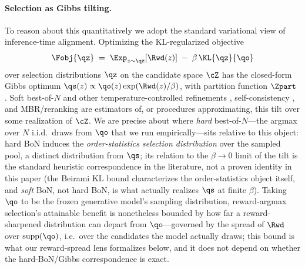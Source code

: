 \paragraph{Selection as Gibbs tilting.}
To reason about this quantitatively we adopt the standard variational view of inference-time alignment. Optimizing the KL-regularized objective
\[
\Fobj{\qz} \;=\; \Exp_{z\sim \qz}[\Rwd(z)] \;-\; \beta\,\KL{\qz}{\qo}
\]
over selection distributions $\qz$ on the candidate space $\cZ$ has the closed-form Gibbs optimum $\qs(z)\propto \qo(z)\exp(\Rwd(z)/\beta)$, with partition function $\Zpart$ \citep{korbak2022kl,beirami2024bon}. Soft best-of-$N$ and other temperature-controlled refinements \citep{verdun2025softbon,yang2024asymptotics,gui2024bonbon}, self-consistency \citep{wang2023selfconsistency}, and MBR/reranking \citep{ichihara2025mbr,mbrasr2025} are estimators of, or procedures approximating, this tilt over some realization of $\cZ$. We are precise about where \emph{hard} best-of-$N$---the argmax over $N$ i.i.d.\ draws from $\qo$ that we run empirically---sits relative to this object: hard BoN induces the \emph{order-statistics selection distribution} over the sampled pool, a distinct distribution from $\qs$; its relation to the $\beta\!\to\!0$ limit of the tilt is the standard heuristic correspondence in the literature, not a proven identity in this paper (the Beirami KL bound \citep{beirami2024bon} characterizes the order-statistics object itself, and \emph{soft} BoN, not hard BoN, is what actually realizes $\qs$ at finite $\beta$). Taking $\qo$ to be the frozen generative model's sampling distribution, reward-argmax selection's attainable benefit is nonetheless bounded by how far a reward-sharpened distribution can depart from $\qo$---governed by the spread of $\Rwd$ over $\operatorname{supp}(\qo)$, i.e.\ over the candidates the model actually draws; this bound is what our reward-spread lens formalizes below, and it does not depend on whether the hard-BoN/Gibbs correspondence is exact.

